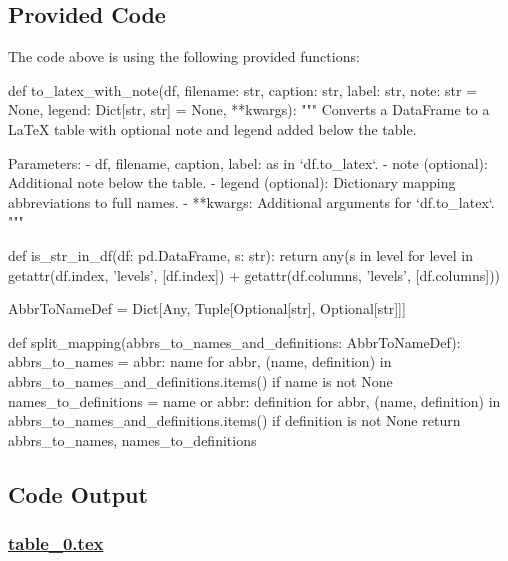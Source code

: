\documentclass[11pt]{article}
\begin{document}
\subsection{Provided Code}
The code above is using the following provided functions:

\begin{python}
def to_latex_with_note(df, filename: str, caption: str, label: str, note: str = None, legend: Dict[str, str] = None, **kwargs):
    """
    Converts a DataFrame to a LaTeX table with optional note and legend added below the table.

    Parameters:
    - df, filename, caption, label: as in `df.to_latex`.
    - note (optional): Additional note below the table.
    - legend (optional): Dictionary mapping abbreviations to full names.
    - **kwargs: Additional arguments for `df.to_latex`.
    """

def is_str_in_df(df: pd.DataFrame, s: str):
    return any(s in level for level in getattr(df.index, 'levels', [df.index]) + getattr(df.columns, 'levels', [df.columns]))

AbbrToNameDef = Dict[Any, Tuple[Optional[str], Optional[str]]]

def split_mapping(abbrs_to_names_and_definitions: AbbrToNameDef):
    abbrs_to_names = {abbr: name for abbr, (name, definition) in abbrs_to_names_and_definitions.items() if name is not None}
    names_to_definitions = {name or abbr: definition for abbr, (name, definition) in abbrs_to_names_and_definitions.items() if definition is not None}
    return abbrs_to_names, names_to_definitions

\end{python}



\subsection{Code Output}

\subsubsection*{\hyperlink{code-LaTeX Table Design-table-0-tex}{table\_0.tex}}
\end{document}
